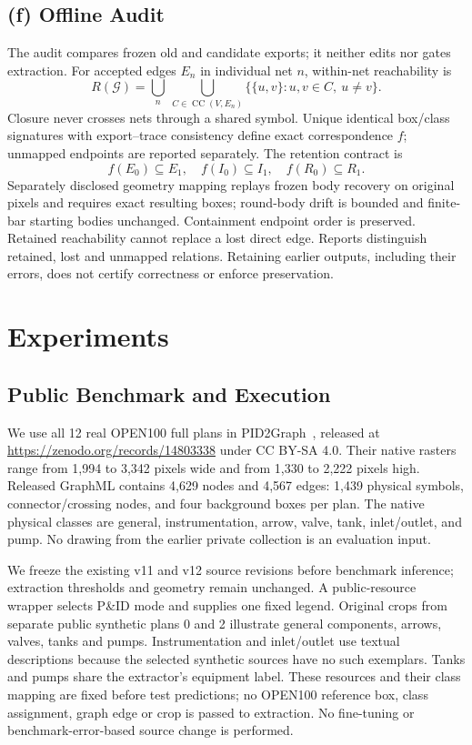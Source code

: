 \documentclass[sigconf,review]{acmart}
\begin{document}
\subsection{(f) Offline Audit}
\label{sec:audit}
The audit compares frozen old and candidate exports; it neither edits nor gates extraction. For accepted edges $E_n$ in individual net $n$, within-net reachability is
\begin{equation}
 R(\mathcal G)=\bigcup_n\ \bigcup_{C\in\operatorname{CC}(V,E_n)}
   \{\{u,v\}:u,v\in C,\ u\ne v\}.
 \label{eq:reach}
\end{equation}
Closure never crosses nets through a shared symbol. Unique identical box/class signatures with export--trace consistency define exact correspondence $f$; unmapped endpoints are reported separately. The retention contract is
\begin{equation}
 f(E_0)\subseteq E_1,\quad f(I_0)\subseteq I_1,\quad
 f(R_0)\subseteq R_1.
 \label{eq:preserve}
\end{equation}
Separately disclosed geometry mapping replays frozen body recovery on original pixels and requires exact resulting boxes; round-body drift is bounded and finite-bar starting bodies unchanged. Containment endpoint order is preserved. Retained reachability cannot replace a lost direct edge. Reports distinguish retained, lost and unmapped relations. Retaining earlier outputs, including their errors, does not certify correctness or enforce preservation.

\section{Experiments}
\subsection{Public Benchmark and Execution}
We use all 12 real OPEN100 full plans in PID2Graph~\cite{sturmer2025pid2graph}, released at \url{https://zenodo.org/records/14803338} under CC BY-SA 4.0. Their native rasters range from 1,994 to 3,342 pixels wide and from 1,330 to 2,222 pixels high. Released GraphML contains 4,629 nodes and 4,567 edges: 1,439 physical symbols, connector/crossing nodes, and four background boxes per plan. The native physical classes are general, instrumentation, arrow, valve, tank, inlet/outlet, and pump. No drawing from the earlier private collection is an evaluation input.

We freeze the existing v11 and v12 source revisions before benchmark inference; extraction thresholds and geometry remain unchanged. A public-resource wrapper selects P\&ID mode and supplies one fixed legend. Original crops from separate public synthetic plans 0 and 2 illustrate general components, arrows, valves, tanks and pumps. Instrumentation and inlet/outlet use textual descriptions because the selected synthetic sources have no such exemplars. Tanks and pumps share the extractor's equipment label. These resources and their class mapping are fixed before test predictions; no OPEN100 reference box, class assignment, graph edge or crop is passed to extraction. No fine-tuning or benchmark-error-based source change is performed.
\end{document}
